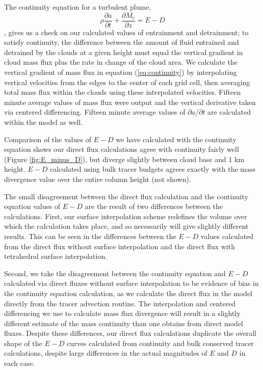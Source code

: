 \documentclass[12pt]{article}
\begin{document}
The continuity equation for a turbulent plume, 
\begin{equation}
    \label{eq:continuity}
    \rho \frac{\partial a}{\partial t} 
    + \frac{\partial M_c}{\partial z}
    = E - D
\end{equation},
gives us a check on our calculated values of entrainment and detrainment; to 
satisfy continuity, the difference between the amount of fluid entrained and 
detrained by the clouds at a given height must equal the vertical gradient in 
cloud mass flux plus the rate in change of the cloud area.  We calculate the 
vertical gradient of mass flux in equation (\ref{eq:continuity}) by 
interpolating vertical velocities from the edges to the center of each grid 
cell, then averaging total mass flux within the clouds using these interpolated 
velocities.  Fifteen minute average values of mass flux were output and the 
vertical derivative taken via centered differencing.  Fifteen minute average 
values of $\partial a/\partial t$ are calculated within the model as well.

Comparison of the values of $E-D$ we have calculated with the continuity 
equation shows our direct flux calculations agree with continuity fairly well
(Figure \ref{fig:E_minus_D}), but diverge slightly between cloud base and 1 km
height.  $E-D$ calculated using bulk tracer budgets agrees exactly with the
mass divergence value over the entire column height (not shown).

The small disagreement between the direct flux calculation and the continuity 
equation values of $E-D$ are the result of two differences between the 
calculations.  First, our surface interpolation scheme redefines the volume 
over which the calculation takes place, and so necessarily will give slightly 
different results.  This can be seen in the differences between the $E-D$ 
values calculated from the direct flux without surface interpolation and the 
direct flux with tetrahedral surface interpolation.

Second, we take the disagreement between the continuity equation and $E-D$
calculated via direct fluxes without surface interpolation to be evidence of
bias in the continuity equation calculation, as we calculate the direct flux in
the model directly from the tracer advection routine.  The interpolation and
centered differencing we use to calculate mass flux divergence will result in a
slightly different estimate of the mass continuity than one obtains from direct
model fluxes.  Despite these differences, our direct flux calculations 
duplicate the overall shape of the $E-D$ curves calculated from continuity and 
bulk conserved tracer calculations, despite large differences in the actual
magnitudes of $E$ and $D$ in each case.
\end{document}
